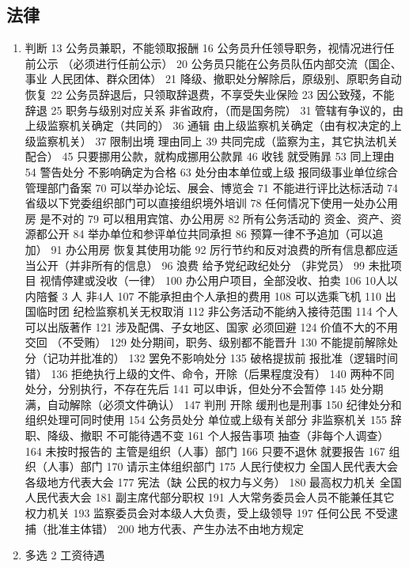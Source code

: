 \documentclass[cyan]{elegantnote}
\begin{document}
\subsection{法律}
\label{sec:orgd63d5b9}
\begin{enumerate}
\item 判断
\label{sec:org52cb085}
13 公务员兼职，不能领取报酬
16 公务员升任领导职务，视情况进行任前公示 （必须进行任前公示）
20 公务员只能在公务员队伍内部交流（国企、事业 人民团体、群众团体）
21 降级、撤职处分解除后，原级别、原职务自动恢复
22 公务员辞退后，只领取辞退费，不享受失业保险
23 因公致殘，不能辞退
25 职务与级别对应关系 非省政府，（而是国务院）
31 管辖有争议的，由上级监察机关确定（共同的）
36 通辑 由上级监察机关确定（由有权决定的上级监察机关）
37 限制出境 理由同上
39 共同完成（监察为主，其它执法机关配合）
45 只要挪用公款，就构成挪用公款暃
46 收钱 就受贿暃
53 同上理由
54 警告处分 不影响确定为合格
63 处分由本单位或上级 报同级事业单位综合管理部门备案
70 可以举办论坛、展会、博览会
71 不能进行评比达标活动
74 省级以下党委组织部门可以直接组织境外培训
78 任何情况下使用一处办公用房 是不对的
79 可以租用宾馆、办公用房
82 所有公务活动的 资金、资产、资源都公开
84 举办单位和参评单位共同承担
86 预算一律不予追加（可以追加）
91 办公用房 恢复其使用功能
92 厉行节约和反对浪费的所有信息都应适当公开（并非所有的信息）
96 浪费 给予党纪政纪处分 （非党员）
99 未批项目 视情停建或没收（一律）
100 办公用户项目，全部没收、拍卖
106 10人以内陪餐 3 人 非4人
107 不能承担由个人承担的费用
108 可以选乘飞机
110 出国临时团 纪检监察机关无权取消
112 非公务活动不能纳入接待范围
114 个人可以出版著作
121 涉及配偶、子女地区、国家 必须回避
124 价值不大的不用交回 （不受贿）
129 处分期间，职务、级别都不能晋升
130 不能提前解除处分（记功并批准的）
132 罢免不影响处分
135 破格提拔前 报批准（逻辑时间错）
136 拒绝执行上级的文件、命令，开除（后果程度没有）
140 两种不同处分，分别执行，不存在先后
141 可以申诉，但处分不会暂停
145 处分期满，自动解除（必须文件确认）
147 判刑 开除 缓刑也是刑事
150 纪律处分和组织处理可同时使用
154 公务员处分 单位或上级有关部分 非监察机关
155 辞职、降级、撤职 不可能待遇不变
161 个人报告事项 抽查（非每个人调查）
164 未按时报告的 主管是组织（人事）部门
166 只要不退休 就要报告
167 组织（人事）部门
170 请示主体组织部门
175 人民行使权力
全国人民代表大会
各级地方代表大会
177 宪法（缺 公民的权力与义务）
180 最高权力机关
全国人民代表大会
181 副主席代部分职权
191 人大常务委员会人员不能兼任其它权力机关
193 监察委员会对本级人大负责，受上级领导
197 任何公民 不受逮捕（批准主体错）
200 地方代表、产生办法不由地方规定
\item 多选
\label{sec:org19ff3b6}
2 工资待遇

\end{enumerate}
\end{document}
